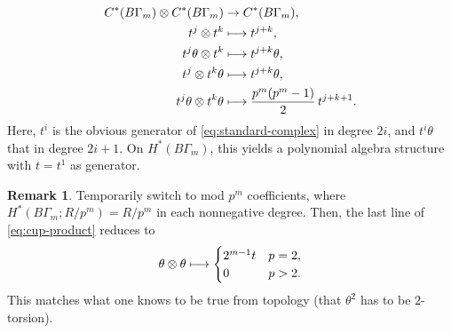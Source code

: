 \documentclass[JEP,XML,SOM,Unicode,NoFloatCountersInSection,published]{cedram}
\newcommand\mto{\mathchoice{\longmapsto}{\mapsto}{\mapsto}{\mapsto}}
\theoremstyle{plain}
\theoremstyle{definition}
\newtheorem{remark}[theorem]{Remark}
\begin{document}
\begin{equation} \label{eq:cup-product}
\begin{aligned}
C^*(B\Gamma_m) \otimes C^*(B\Gamma_m) &\to C^*(B\Gamma_m), \\
t^j \otimes t^k &\mto t^{j+k}, \\
t^j\theta \otimes t^k &\mto t^{j+k}\theta, \\
t^j \otimes t^k\theta &\mto t^{j+k}\theta, \\
t^j\theta \otimes t^k\theta &\mto\frac{p^m(p^m-1)}{2}\, t^{j+k+1}.
\end{aligned}
\end{equation}
Here, $t^i$ is the obvious generator of \eqref{eq:standard-complex} in degree $2i$, and $t^i\theta$ that in degree $2i+1$. On $H^*(B\Gamma_m)$, this yields a polynomial algebra structure with $t = t^1$ as generator.

\begin{remark}
Temporarily switch to mod $p^m$ coefficients, where $H^*(B\Gamma_m;R/p^m) = R/p^m$ in each nonnegative degree. Then, the last line of \eqref{eq:cup-product} reduces to
\begin{equation*}
\theta \otimes \theta \mto \begin{cases} 2^{m-1} t & p = 2, \\
0 & p>2.
\end{cases}
\end{equation*}
This matches what one knows to be true from topology (that $\theta^2$ has to be $2$-torsion).
\end{remark}
\end{document}
